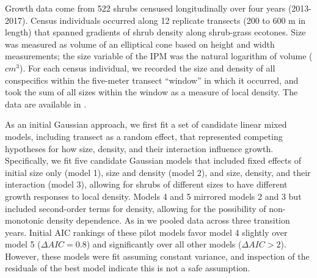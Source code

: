 \documentclass[12pt]{article}
\begin{document}
Growth data come from 522 shrubs censused longitudinally over four years (2013-2017). 
Census individuals occurred along 12 replicate transects (200 to 600 m in length) that spanned gradients of shrub density along shrub-grass ecotones. 
Size was measured as volume of an elliptical cone based on height and width measurements; the size variable of the IPM was the natural logarithm of volume ($cm^3$). 
For each census individual, we recorded the size and density of all conspecifics within the five-meter transect ``window'' in which it occurred, and took the sum of all sizes within the window as a measure of local density. 
The data are available in \cite{shrubdata}. 

As an initial Gaussian approach, we first fit a set of candidate linear mixed models, including transect as a random effect, that represented competing hypotheses for how size, density, and their interaction influence growth. 
Specifically, we fit five candidate Gaussian models that included fixed effects of initial size only (model 1), size and density (model 2), and size, density, and their interaction (model 3), allowing for shrubs of different sizes to have different growth responses to local density. 
Models 4 and 5 mirrored models 2 and 3 but included second-order terms for density, allowing for the possibility of non-monotonic density dependence. 
As in \citep{drees2023demography} we pooled data across three transition years. 
Initial AIC rankings of these pilot models favor model 4 slightly over model 5 ($\Delta AIC = 0.8$) and significantly over all other models ($\Delta AIC > 2$). 
However, these models were fit assuming constant variance, and inspection of the residuals of the best model indicate this is not a safe assumption. 
\end{document}
